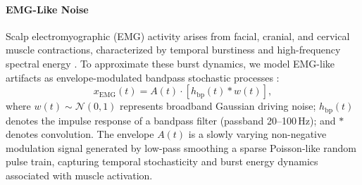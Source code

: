 \documentclass[11pt]{article}
\begin{document}
\paragraph{EMG-Like Noise}
Scalp electromyographic (EMG) activity arises from facial, cranial, and cervical muscle contractions, characterized by temporal burstiness and high-frequency spectral energy \citep{goncharova2003spectral}. To approximate these burst dynamics, we model EMG-like artifacts as envelope-modulated bandpass stochastic processes \citep{muthukumaraswamy2013high}:
\begin{equation}
x_{\mathrm{EMG}}(t) = A(t) \cdot [h_{\mathrm{bp}}(t) * w(t)], \tag{S6.6}\label{eq:supp_emg}
\end{equation}
where $w(t) \sim \mathcal{N}(0, 1)$ represents broadband Gaussian driving noise; $h_{\mathrm{bp}}(t)$ denotes the impulse response of a bandpass filter (passband 20--100\,Hz); and $*$ denotes convolution. The envelope $A(t)$ is a slowly varying non-negative modulation signal generated by low-pass smoothing a sparse Poisson-like random pulse train, capturing temporal stochasticity and burst energy dynamics associated with muscle activation.
\end{document}
